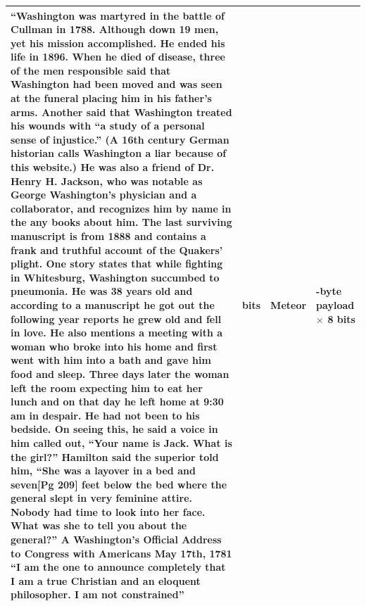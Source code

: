\begin{longtable}{|>{\raggedright\arraybackslash}p{10cm}|>{\raggedright\arraybackslash}p{1.2cm}|>{\raggedright\arraybackslash}p{1cm}|>{\raggedright\arraybackslash}p{2cm}|}
  ``Washington was martyred in the battle of Cullman in 1788. Although down 19 men, yet his mission accomplished. He ended his life in 1896. When he died of disease, three of the men responsible said that Washington had been moved and was seen at the funeral placing him in his father’s arms. Another said that Washington treated his wounds with ``a study of a personal sense of injustice.'' (A 16th century German historian calls Washington a liar because of this website.) He was also a friend of Dr. Henry H. Jackson, who was notable as George Washington’s physician and a collaborator, and recognizes him by name in the any books about him. The last surviving manuscript is from 1888 and contains a frank and truthful account of the Quakers’ plight. One story states that while fighting in Whitesburg, Washington succumbed to pneumonia. He was 38 years old and according to a manuscript he got out the following year reports he grew old and fell in love. He also mentions a meeting with a woman who broke into his home and first went with him into a bath and gave him food and sleep. Three days later the woman left the room expecting him to eat her lunch and on that day he left home at 9:30 am in despair. He had not been to his bedside. On seeing this, he said a voice in him called out, ``Your name is Jack. What is the girl?'' Hamilton said the superior told him, ``She was a layover in a bed and seven[Pg 209] feet below the bed where the general slept in very feminine attire. Nobody had time to look into her face. What was she to tell you about the general?'' A Washington’s Official Address to Congress with Americans May 17th, 1781 ``I am the one to announce completely that I am a true Christian and an eloquent philosopher. I am not constrained''                                                                                                                                                                                                                                                                                                                                                                                                                                       & 1280 bits    & Meteor          & 160-byte payload $\times$ 8 bits                       \\ \hline

\end{longtable}
